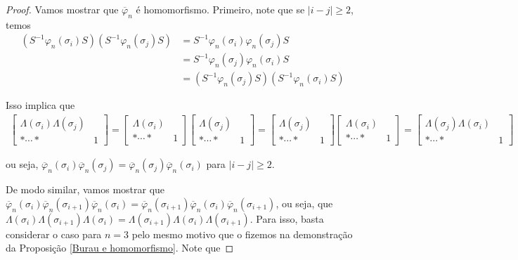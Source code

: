 \documentclass[a4paper,portuguese,11pt,twoside, leqno]{book}
\theoremstyle{definition}
\begin{document}
	\begin{proof}
		Vamos mostrar que $\overline{\varphi}_n$ é homomorfismo. Primeiro, note que se $|i-j|\geq 2$, temos
		\begin{align*}
		(S^{-1}\varphi_n(\sigma_i)S)(S^{-1}\varphi_n(\sigma_j)S) &= S^{-1}\varphi_n(\sigma_i)\varphi_n(\sigma_j)S \\ 
		&= S^{-1}\varphi_n(\sigma_j)\varphi_n(\sigma_i)S \\
		&= (S^{-1}\varphi_n(\sigma_j)S)(S^{-1}\varphi_n(\sigma_i)S)
		\end{align*}
		\par\vspace{0.3cm} Isso implica que
		\begin{align*}
		\left[ \begin{array}{c|c}
		\Lambda(\sigma_i)\Lambda(\sigma_j) & \\
		\hline
		\ast\cdots\ast & 1
		\end{array}\right] = 
		\left[ \begin{array}{c|c}
		\Lambda(\sigma_i) & \\
		\hline
		\ast\cdots\ast & 1
		\end{array}\right]\left[ \begin{array}{c|c}
		\Lambda(\sigma_j) & \\
		\hline
		\ast\cdots\ast & 1
		\end{array}\right]  = \left[\begin{array}{c|c}
		\Lambda(\sigma_j) & \\
		\hline
		\ast\cdots\ast & 1
		\end{array}\right]\left[ \begin{array}{c|c}
		\Lambda(\sigma_i) & \\
		\hline
		\ast\cdots\ast & 1
		\end{array}\right] =  \left[\begin{array}{c|c}
		\Lambda(\sigma_j)\Lambda(\sigma_i) & \\
		\hline
		\ast\cdots\ast & 1
		\end{array}\right]
		\end{align*}
		\par\vspace{0.3cm} ou seja, $\overline{\varphi}_n(\sigma_i)\overline{\varphi}_n(\sigma_j) = \overline{\varphi}_n(\sigma_j)\overline{\varphi}_n(\sigma_i)$ para $|i-j|\geq 2$.
		\par\vspace{0.3cm} De modo similar, vamos mostrar que $\overline{\varphi}_n(\sigma_i)\overline{\varphi}_n(\sigma_{i+1})\overline{\varphi}_n(\sigma_i) = \overline{\varphi}_n(\sigma_{i+1})\overline{\varphi}_n(\sigma_i)\overline{\varphi}_n(\sigma_{i+1})$, ou seja, que $\Lambda(\sigma_i)\Lambda(\sigma_{i+1})\Lambda(\sigma_i) = \Lambda(\sigma_{i+1})\Lambda(\sigma_i)\Lambda(\sigma_{i+1})$. Para isso, basta considerar o caso para $n=3$ pelo mesmo motivo que o fizemos na demonstração da Proposição \eqref{Burau e homomorfismo}. Note que

\end{proof}
\end{document}
